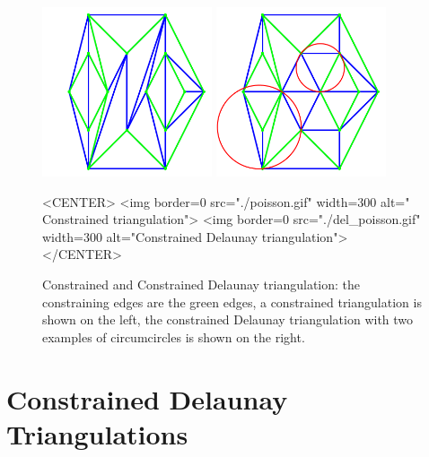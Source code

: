 \begin{figure}
\begin{ccTexOnly}
\begin{center}
\includegraphics[width=5cm]{Triangulation_2/poisson}
\includegraphics[width=5cm]{Triangulation_2/del_poisson}
\end{center}
\end{ccTexOnly}

\begin{ccHtmlOnly}
<CENTER>
<img border=0 src="./poisson.gif" width=300 alt=" Constrained triangulation">
<img border=0 src="./del_poisson.gif" width=300 alt="Constrained Delaunay triangulation">
</CENTER>
\end{ccHtmlOnly}

\caption{Constrained and Constrained Delaunay triangulation: 
 the constraining edges are the green edges,  a constrained
triangulation is shown on the left, the constrained Delaunay
triangulation with two examples of circumcircles is shown on the right.}
\label{2D_Triangulation_Fig_constrained}
\end{figure}


\section{Constrained Delaunay Triangulations\label{Section_2D_Triangulations_Constrained_Delaunay}}

